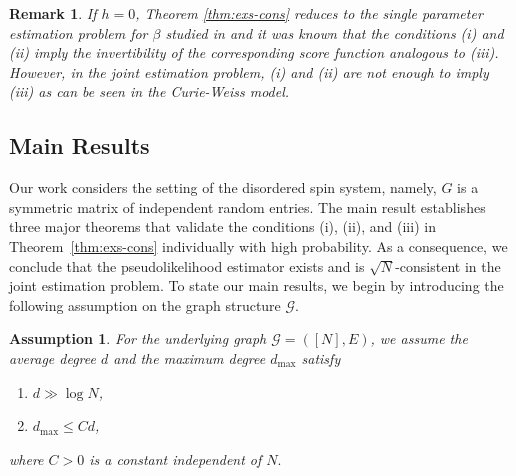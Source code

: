 \documentclass[letterpaper,11pt,reqno]{amsart}
\newtheorem{ass}[thm]{Assumption}
\renewcommand{\le}{\leqslant}
\newcommand{\cG}{\mathcal{G}}\newcommand{\cH}{\mathcal{H}}\newcommand{\cI}{\mathcal{I}}
\newtheorem{remark}[theorem]{Remark}
\begin{document}
\begin{remark}
    \rm
If $h=0$, Theorem \ref{thm:exs-cons} reduces to the single parameter estimation problem for $\beta$ studied in \cite{Chat07} and it was known that the conditions (i) and (ii) imply the invertibility of the corresponding score function analogous to (iii). However, in the joint estimation problem, (i) and (ii) are not enough to imply (iii) as can be seen in the Curie-Weiss model.

\end{remark}

\subsection{Main Results}

Our work considers the setting of the disordered spin system, namely, $G$ is a symmetric matrix of independent random entries. The main result establishes three major theorems that validate the conditions (i), (ii), and (iii) in Theorem~\ref{thm:exs-cons} individually with high probability. As a consequence, we conclude that the pseudolikelihood estimator exists and is $\sqrt{N}$-consistent in the joint estimation problem. To state our main results, we begin by introducing  the following assumption on the graph structure $\mathcal{G}$.

\begin{ass}\label{ass:graph}
    For the underlying graph $\cG = ([N],E)$, we assume the average degree $d$ and the maximum degree $d_{\max}$ satisfy 
    \begin{enumerate}
        \item[$(i)$] $d \gg \log N$,
        \item[$(ii)$] $d_{\max}\le Cd$, 
    \end{enumerate}
    where  $C>0$ is a constant independent of $N.$
\end{ass}
\end{document}
